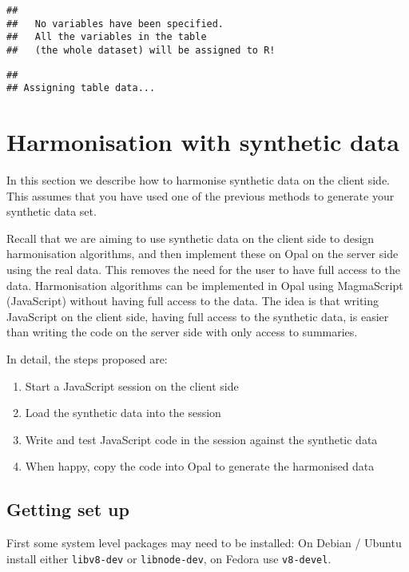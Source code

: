 \documentclass[
]{book}
\providecommand{\tightlist}{%
  \setlength{\itemsep}{0pt}\setlength{\parskip}{0pt}}
\begin{document}
\begin{verbatim}
## 
##   No variables have been specified. 
##   All the variables in the table 
##   (the whole dataset) will be assigned to R!
\end{verbatim}

\begin{verbatim}
## 
## Assigning table data...
\end{verbatim}

\hypertarget{harmonisation-with-synthetic-data}{%
\chapter{Harmonisation with synthetic data}\label{harmonisation-with-synthetic-data}}

In this section we describe how to harmonise synthetic data on the client side. This assumes that you have used one of the previous methods to generate your synthetic data set.

Recall that we are aiming to use synthetic data on the client side to design harmonisation algorithms, and then implement these on Opal on the server side using the real data. This removes the need for the user to have full access to the data. Harmonisation algorithms can be implemented in Opal using MagmaScript (JavaScript) without having full access to the data. The idea is that writing JavaScript on the client side, having full access to the synthetic data, is easier than writing the code on the server side with only access to summaries.

In detail, the steps proposed are:

\begin{enumerate}
\def\labelenumi{\arabic{enumi}.}
\tightlist
\item
  Start a JavaScript session on the client side
\item
  Load the synthetic data into the session
\item
  Write and test JavaScript code in the session against the synthetic data
\item
  When happy, copy the code into Opal to generate the harmonised data
\end{enumerate}

\hypertarget{getting-set-up}{%
\section{Getting set up}\label{getting-set-up}}

First some system level packages may need to be installed: On Debian / Ubuntu install either \texttt{libv8-dev} or \texttt{libnode-dev}, on Fedora use \texttt{v8-devel}.
\end{document}
